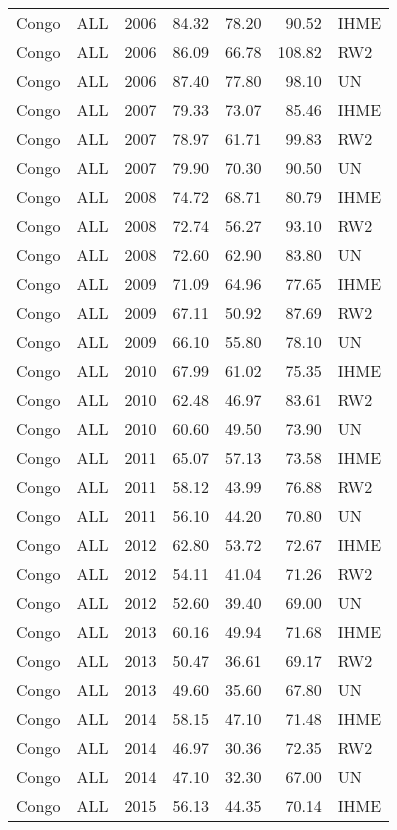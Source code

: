 \begin{longtable}{lllrrrl}
  Congo & ALL & 2006 & 84.32 & 78.20 & 90.52 & IHME \\ 
  Congo & ALL & 2006 & 86.09 & 66.78 & 108.82 & RW2 \\ 
  Congo & ALL & 2006 & 87.40 & 77.80 & 98.10 & UN \\ 
  Congo & ALL & 2007 & 79.33 & 73.07 & 85.46 & IHME \\ 
  Congo & ALL & 2007 & 78.97 & 61.71 & 99.83 & RW2 \\ 
  Congo & ALL & 2007 & 79.90 & 70.30 & 90.50 & UN \\ 
  Congo & ALL & 2008 & 74.72 & 68.71 & 80.79 & IHME \\ 
  Congo & ALL & 2008 & 72.74 & 56.27 & 93.10 & RW2 \\ 
  Congo & ALL & 2008 & 72.60 & 62.90 & 83.80 & UN \\ 
  Congo & ALL & 2009 & 71.09 & 64.96 & 77.65 & IHME \\ 
  Congo & ALL & 2009 & 67.11 & 50.92 & 87.69 & RW2 \\ 
  Congo & ALL & 2009 & 66.10 & 55.80 & 78.10 & UN \\ 
  Congo & ALL & 2010 & 67.99 & 61.02 & 75.35 & IHME \\ 
  Congo & ALL & 2010 & 62.48 & 46.97 & 83.61 & RW2 \\ 
  Congo & ALL & 2010 & 60.60 & 49.50 & 73.90 & UN \\ 
  Congo & ALL & 2011 & 65.07 & 57.13 & 73.58 & IHME \\ 
  Congo & ALL & 2011 & 58.12 & 43.99 & 76.88 & RW2 \\ 
  Congo & ALL & 2011 & 56.10 & 44.20 & 70.80 & UN \\ 
  Congo & ALL & 2012 & 62.80 & 53.72 & 72.67 & IHME \\ 
  Congo & ALL & 2012 & 54.11 & 41.04 & 71.26 & RW2 \\ 
  Congo & ALL & 2012 & 52.60 & 39.40 & 69.00 & UN \\ 
  Congo & ALL & 2013 & 60.16 & 49.94 & 71.68 & IHME \\ 
  Congo & ALL & 2013 & 50.47 & 36.61 & 69.17 & RW2 \\ 
  Congo & ALL & 2013 & 49.60 & 35.60 & 67.80 & UN \\ 
  Congo & ALL & 2014 & 58.15 & 47.10 & 71.48 & IHME \\ 
  Congo & ALL & 2014 & 46.97 & 30.36 & 72.35 & RW2 \\ 
  Congo & ALL & 2014 & 47.10 & 32.30 & 67.00 & UN \\ 
  Congo & ALL & 2015 & 56.13 & 44.35 & 70.14 & IHME \\ 

\end{longtable}
